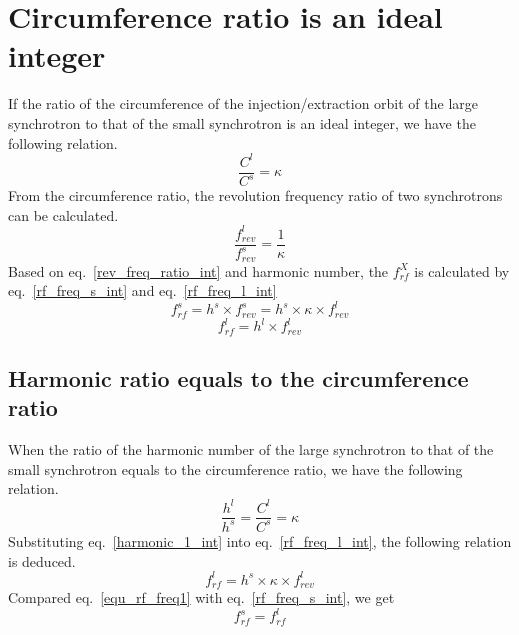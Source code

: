 \section{ Circumference ratio is an ideal integer}

If the ratio of the circumference of the injection/extraction orbit of the large synchrotron to that of the small synchrotron is an ideal integer, we have the following relation. 
\begin{equation}
\frac{C^l}{C^s}=\kappa \label{circumference_ratio_int}
\end{equation}
From the circumference ratio, the revolution frequency ratio of two synchrotrons can be calculated.
\begin{equation}
\frac{f_{rev}^{l}}{f_{rev}^{s}}=\frac{1}{\kappa} \label{rev_freq_ratio_int}
\end{equation}
Based on eq.~\ref{rev_freq_ratio_int} and harmonic number, the $f_{rf}^{X}$ is calculated by eq.~\ref{rf_freq_s_int} and eq.~\ref{rf_freq_l_int}
\begin{equation} 
f_{rf}^{s}= h^s \times f_{rev}^{s}=h^s \times \kappa \times f_{rev}^{l} \label{rf_freq_s_int}
\end{equation}
\begin{equation} 
f_{rf}^{l}= h^l \times f_{rev}^{l} \label{rf_freq_l_int}
\end{equation}

\subsection{Harmonic ratio equals to the circumference ratio}
\label{sec:cir_no_int}
When the ratio of the harmonic number of the large synchrotron to that of the small synchrotron equals to the circumference ratio, we have the following relation.
\begin{equation}
\frac {h^{l}}{h^{s}}=\frac {C^{l}}{C^{s}}= \kappa  \label{harmonic_1_int}
\end{equation}
Substituting eq.~\ref{harmonic_1_int} into eq.~\ref{rf_freq_l_int}, the following relation is deduced. 
\begin{equation}
f_{rf}^{l}= h^s \times \kappa \times f_{rev}^{l} \label{equ_rf_freq1}
\end{equation}
Compared eq.~\ref{equ_rf_freq1} with eq.~\ref{rf_freq_s_int}, we get
\begin{equation}
f_{rf}^{s}= f_{rf}^{l}\label{equ_rf_freq}
\end{equation}

